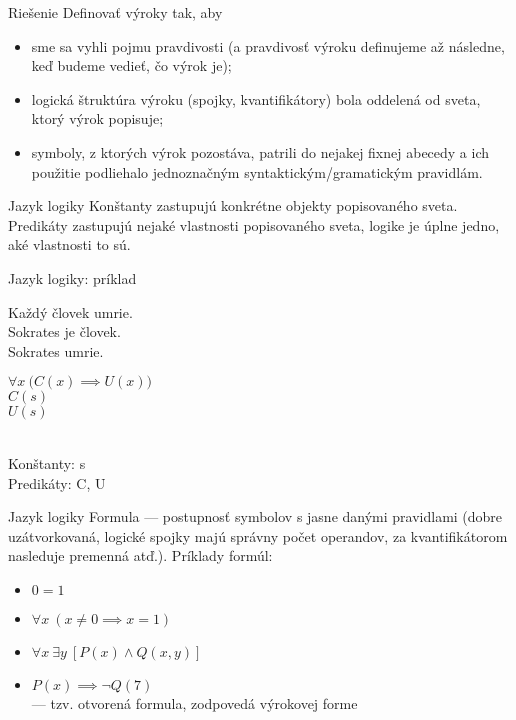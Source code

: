 \documentclass[12pt]{beamer}
\theoremstyle{definition}
\let\A\forall
\let\E\exists
\begin{document}
\begin{frame}{Riešenie}
Definovať výroky tak, aby
\begin{itemize}
\item sme sa vyhli pojmu pravdivosti (a pravdivosť výroku definujeme až následne, keď budeme vedieť, čo výrok je);
\pause
\item logická štruktúra výroku (spojky, kvantifikátory) bola oddelená od sveta, ktorý výrok popisuje;
\pause
\item symboly, z ktorých výrok pozostáva, patrili do nejakej fixnej abecedy a ich použitie podliehalo jednoznačným syntaktickým/gramatickým pravidlám.
\end{itemize}
\end{frame}

\begin{frame}{Jazyk logiky}
\alert{Konštanty} zastupujú konkrétne objekty popisovaného sveta.\\[5mm]
\pause
\alert{Predikáty} zastupujú nejaké vlastnosti popisovaného sveta, logike je úplne jedno, aké vlastnosti to sú.
\end{frame}

\begin{frame}{Jazyk logiky: príklad}
\begin{minipage}{0.5\textwidth}
Každý človek umrie.\\[2mm]
Sokrates je človek.\\[2mm]
Sokrates umrie.
\end{minipage}
\begin{minipage}{0.4\textwidth}
$\A x\ \big(C(x)\implies U(x)\big)$\\[2mm]
$C(s)$\\[2mm]
$U(s)$
\end{minipage}
\\[10mm]
Konštanty: s\\
Predikáty: C, U
\end{frame}

\begin{frame}{Jazyk logiky}
\alert{Formula} --- postupnosť symbolov s jasne danými pravidlami (dobre uzátvorkovaná, logické spojky majú správny počet operandov, za kvantifikátorom nasleduje premenná atď.).
\pause
Príklady formúl:
\begin{itemize}
\item $0 = 1$
\item $\A x\ (x \neq 0 \implies x = 1)$
\item $\A x\ \E y\ [P(x) \land Q(x, y)]$
\item $P(x) \implies \lnot Q(7)$\\ --- tzv. otvorená formula, zodpovedá výrokovej forme
\end{itemize}
\end{frame}
\end{document}
